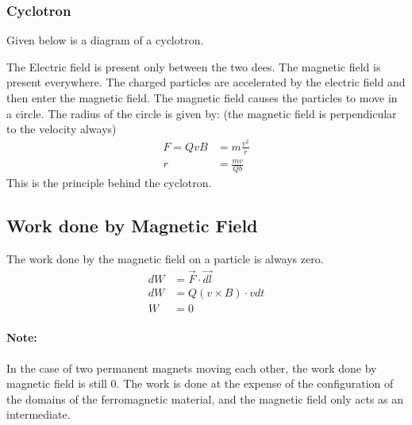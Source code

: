 \documentclass{article}
\begin{document}
\subsubsection*{Cyclotron}
Given below is a diagram of a cyclotron.\\
\begin{figure}[H]
\end{figure}
The Electric field is present only between the two dees.
The magnetic field is present everywhere.
The charged particles are accelerated by the electric field and then enter the magnetic field.
The magnetic field causes the particles to move in a circle.
The radius of the circle is given by: (the magnetic field is perpendicular to the velocity always)
\begin{align*}
	F = QvB & = m\frac{v^2}{r} \\
	r       & = \frac{mv}{Qb}
\end{align*}
This is the principle behind the cyclotron.

\subsection{Work done by Magnetic Field}
The work done by the magnetic field on a particle is always zero.
\begin{align*}
	dW & = \vec{F} \cdot \vec{dl}  \\
	dW & = Q(v \times B) \cdot vdt \\
	W  & = 0
\end{align*}

\paragraph{Note: } In the case of two permanent magnets moving each other, the work done by magnetic field is still $0$.
The work is done at the expense of the configuration of the domains of the ferromagnetic material, and the magnetic field only acts as an intermediate.
\end{document}
